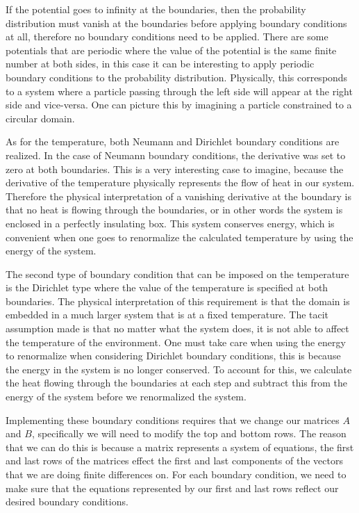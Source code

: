 If the potential goes to infinity at the boundaries, then the probability distribution must vanish at the boundaries before applying boundary conditions at all, therefore no boundary conditions need to be applied. There are some potentials that are periodic where the value of the potential is the same finite number at both sides, in this case it can be interesting to apply periodic boundary conditions to the probability distribution. Physically, this corresponds to a system where a particle passing through the left side will appear at the right side and vice-versa. One can picture this by imagining a particle constrained to a circular domain.

As for the temperature, both Neumann and Dirichlet boundary conditions are realized. In the case of Neumann boundary conditions, the derivative was set to zero at both boundaries. This is a very interesting case to imagine, because the derivative of the temperature physically represents the flow of heat in our system. Therefore the physical interpretation of a vanishing derivative at the boundary is that no heat is flowing through the boundaries, or in other words the system is enclosed in a perfectly insulating box. This system conserves energy, which is convenient when one goes to renormalize the calculated temperature by using the energy of the system.

The second type of boundary condition that can be imposed on the temperature is the Dirichlet type where the value of the temperature is specified at both boundaries. The physical interpretation of this requirement is that the domain is embedded in a much larger system that is at a fixed temperature. The tacit assumption made is that no matter what the system does, it is not able to affect the temperature of the environment. One must take care when using the energy to renormalize when considering Dirichlet boundary conditions, this is because the energy in the system is no longer conserved. To account for this, we calculate the heat flowing through the boundaries at each step and subtract this from the energy of the system before we renormalized the system.

Implementing these boundary conditions requires that we change our matrices $A$ and $B$, specifically we will need to modify the top and bottom rows. The reason that we can do this is because a matrix represents a system of equations, the first and last rows of the matrices effect the first and last components of the vectors that we are doing finite differences on. For each boundary condition, we need to make sure that the equations represented by our first and last rows reflect our desired boundary conditions.

